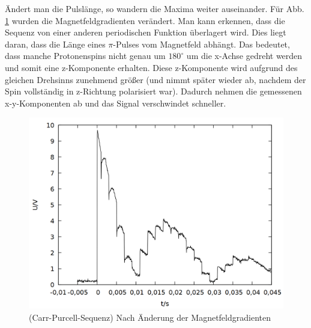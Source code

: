 Ändert man die Pulslänge, so wandern die Maxima weiter auseinander. Für Abb. \ref{fig:carr_b} wurden die Magnetfeldgradienten verändert. Man kann erkennen, dass die Sequenz von einer anderen periodischen Funktion überlagert wird. Dies liegt daran, dass die Länge eines $\pi$-Pulses vom Magnetfeld abhängt. Das bedeutet, dass manche Protonenspins nicht genau um $180^\circ$ um die x-Achse gedreht werden und somit eine z-Komponente erhalten. Diese z-Komponente wird aufgrund des gleichen Drehsinns zunehmend größer (und nimmt später wieder ab, nachdem der Spin vollständig in z-Richtung polarisiert war). Dadurch nehmen die gemessenen x-y-Komponenten ab und das Signal verschwindet schneller.
 
\begin{figure}[h]
\centering
\includegraphics[width=0.75\linewidth]{data/p402_443_data/carr_purcell_sequenz/plot_157.png}
\caption{(Carr-Purcell-Sequenz) Nach Änderung der Magnetfeldgradienten}
\label{fig:carr_b}
\end{figure}

